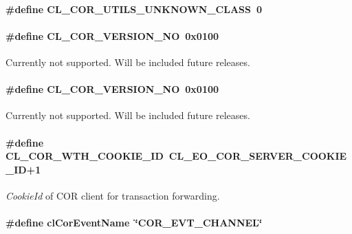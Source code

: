 \hypertarget{group__group13_ga324}{
\paragraph[CL\_\-COR\_\-UTILS\_\-UNKNOWN\_\-CLASS]{\setlength{\rightskip}{0pt plus 5cm}\#define CL\_\-COR\_\-UTILS\_\-UNKNOWN\_\-CLASS~0}\hfill}
\label{group__group13_ga324}


\hypertarget{group__group13_ga276}{
\paragraph[CL\_\-COR\_\-VERSION\_\-NO]{\setlength{\rightskip}{0pt plus 5cm}\#define CL\_\-COR\_\-VERSION\_\-NO~0x0100}\hfill}
\label{group__group13_ga276}


Currently not supported. Will be included future releases. \hypertarget{group__group13_ga275}{
\paragraph[CL\_\-COR\_\-VERSION\_\-NO]{\setlength{\rightskip}{0pt plus 5cm}\#define CL\_\-COR\_\-VERSION\_\-NO~0x0100}\hfill}
\label{group__group13_ga275}


Currently not supported. Will be included future releases. \hypertarget{group__group13_ga274}{
\paragraph[CL\_\-COR\_\-WTH\_\-COOKIE\_\-ID]{\setlength{\rightskip}{0pt plus 5cm}\#define CL\_\-COR\_\-WTH\_\-COOKIE\_\-ID~CL\_\-EO\_\-COR\_\-SERVER\_\-COOKIE\_\-ID+1}\hfill}
\label{group__group13_ga274}


{\em Cookie\-Id\/} of COR client for transaction forwarding. \hypertarget{group__group13_ga318}{
\paragraph[clCorEventName]{\setlength{\rightskip}{0pt plus 5cm}\#define cl\-Cor\-Event\-Name~\char`\"{}COR\_\-EVT\_\-CHANNEL\char`\"{}}\hfill}
\label{group__group13_ga318}


